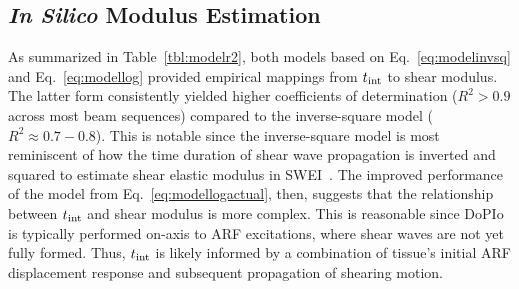 
\subsection{\emph{In Silico} Modulus Estimation}

As summarized in Table~\ref{tbl:modelr2}, both models based on Eq.~\ref{eq:modelinvsq} and Eq.~\ref{eq:modellog} provided empirical mappings from $t_{\textnormal{int}}$ to shear modulus. The latter form consistently yielded higher coefficients of determination ($R^2 > 0.9$ across most beam sequences) compared to the inverse-square model ($R^2 \approx 0.7 - 0.8$). This is notable since the inverse-square model is most reminiscent of how the time duration of shear wave propagation is inverted and squared to estimate shear elastic modulus in SWEI~\cite{sarvazyan_Shear_1998,palmeri_Ultrasonic_2006}. The improved performance of the model from Eq.~\ref{eq:modellogactual}, then, suggests that the relationship between $t_{\textnormal{int}}$ and shear modulus is more complex. This is reasonable since DoPIo is typically performed on-axis to ARF excitations, where shear waves are not yet fully formed. Thus, $t_{\textnormal{int}}$ is likely informed by a combination of tissue's initial ARF displacement response and subsequent propagation of shearing motion.

